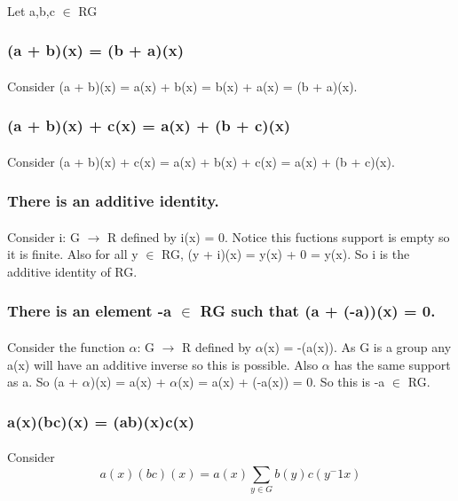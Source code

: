 \documentclass[11pt]{article}
\begin{document}
\paragraph{}
Let a,b,c \(\in\) RG
\subsubsection{(a + b)(x) = (b + a)(x)}
\label{sec:org3f1f499}
\paragraph{}
Consider (a + b)(x) = a(x) + b(x) = b(x) + a(x) = (b + a)(x).
\subsubsection{(a + b)(x) + c(x) = a(x) + (b + c)(x)}
\label{sec:org61abe58}
\paragraph{}
Consider (a + b)(x) + c(x) = a(x) + b(x) + c(x) = a(x) + (b + c)(x). 
\subsubsection{There is an additive identity.}
\label{sec:orge01e368}
\paragraph{}
Consider i: G \(\to\) R defined by i(x) = 0. Notice this fuctions support is empty so it is finite. Also for all y \(\in\) RG, (y + i)(x) = y(x) + 0 = y(x).
So i is the additive identity of RG.
\subsubsection{There is an element -a \(\in\) RG such that (a + (-a))(x) = 0.}
\label{sec:org25ac212}
\paragraph{}
Consider the function \(\alpha\): G \(\to\) R defined by \(\alpha\)(x) = -(a(x)). As G is a group any a(x) will have an additive inverse so this is possible. Also \(\alpha\) has the same support as a. So (a + \(\alpha\))(x) = a(x) + \(\alpha\)(x) = a(x) + (-a(x)) = 0. So this is -a \(\in\) RG.
\subsubsection{a(x)(bc)(x) = (ab)(x)c(x)}
\label{sec:org7550bbb}
\paragraph{}
Consider \[a(x)(bc)(x) = a(x)\sum_{y\in G} b(y)c(y^-1 x)\]
\end{document}

